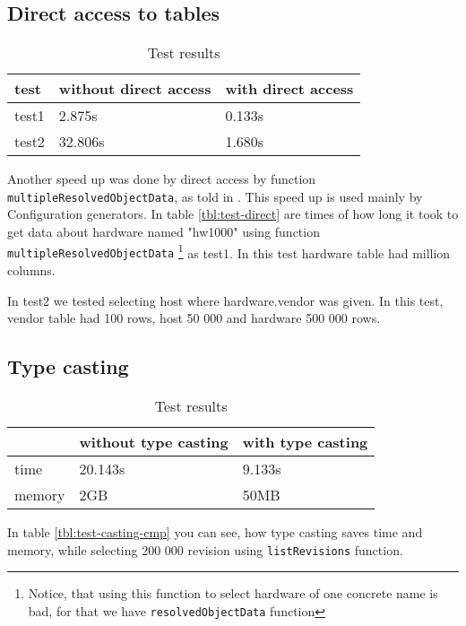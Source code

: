 \documentclass[deska]{subfiles}
\begin{document}
\subsection{Direct access to tables}
\label{sec:test-direct}


\label{tbl:test-direct}
\begin{longtable}{ l | l | l }
\caption{Test results}\\
test & without direct access & with direct access \\
\hline
\endhead
test1 & 2.875s & 0.133s \\
test2 & 32.806s & 1.680s \\
\end{longtable}

Another speed up was done by direct access by function {\tt multipleResolvedObjectData}, as told in .
This speed up is used mainly by Configuration generators.
In table \ref{tbl:test-direct} are times of how long it took to get data about hardware named "hw1000" using function {\tt multipleResolvedObjectData}
\footnote{Notice, that using this function to select hardware of one concrete name is bad, for that we have
{\tt resolvedObjectData} function}
as test1. In this test hardware table had million columns.

In test2 we tested selecting host where hardware.vendor was given. In this test, vendor table
had 100 rows, host 50 000 and hardware 500 000 rows.

\subsection{Type casting}
\label{sec:test-cast}

\label{tbl:test-casting-cmp}
\begin{longtable}{ l | l | l }
\caption{Test results}\\
& without type casting & with type casting \\
\hline
\endhead
time & 20.143s & 9.133s \\
memory & 2GB & 50MB \\
\end{longtable}

In table \ref{tbl:test-casting-cmp} you can see, how type casting saves time and memory,
while selecting 200 000 revision using {\tt listRevisions} function.
\end{document}
